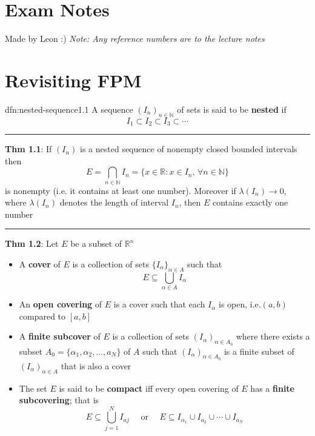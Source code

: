 \documentclass[landscape, 8pt]{extarticle}
\begin{document}
\setlength{\abovedisplayskip}{3.5pt}
\setlength{\belowdisplayskip}{3.5pt}
\setlength{\abovedisplayshortskip}{3.5pt}
\setlength{\belowdisplayshortskip}{3.5pt}

\begin{multicols}{3}
\raggedcolumns


\section*{\huge Exam Notes}
Made by Leon :) \textit{Note: Any reference numbers are to the lecture notes}

\vspace{-5pt}
\section{Revisiting FPM}

\begin{dfn}{dfn:nested-sequence}{1.1}
	A sequence $(I_{n})_{n\in\mathbb{N}}$ of sets is said to be \textbf{nested} if
	\[I_{1} \subset I_{2} \subset I_{3} \subset \cdots\]

	\noindent\rule{\textwidth}{0.2pt}
	\textbf{Thm 1.1}: If $(I_{n})$ is a nested sequence of nonempty closed bounded intervals then
	$$E = \bigcap\limits_{n\in\mathbb{N}} I_{n} = \{x\in\mathbb{R}: x\in I_{n},\,\forall n\in\mathbb{N}\}$$
	is nonempty (i.e. it contains at least one number). Moreover if $\lambda(I_{n})\to 0$, where $\lambda(I_{n})$ denotes the length of interval $I_{n}$, then $E$ contains exactly one number

	\noindent\rule{\textwidth}{0.2pt}
	\textbf{Thm 1.2}: Let $E$ be a subset of $\mathbb{R}^n$
	\begin{itemize}
		\setlength\itemsep{0em}
		\item A \textbf{cover} of $E$ is a collection of sets  $\{I_{\alpha}\}_{\alpha\in A}$ such that
			\[E\subseteq \bigcup\limits_{\alpha\in A} I_{\alpha}\]
		\item An \textbf{open covering} of $E$ is a cover such that each $I_{\alpha}$ is open, i.e.$(a,b)$ compared to $[a,b]$
		\item A \textbf{finite subcover} of $E$ is a collection of sets $(I_{\alpha})_{\alpha\in A_{0}}$ where there exists a subset $A_{0} = \{\alpha_{1}, \alpha_{2}, \dots, a_{N}\}$ of $A$ such that $(I_{\alpha})_{\alpha\in A_{0}}$ is a finite subset of $(I_{\alpha})_{\alpha\in A}$ that is also a cover
		\item The set $E$ is said to be \textbf{compact} iff every open covering of $E$ has a \textbf{finite subcovering}; that is
			\[E\subseteq \bigcup\limits_{j=1}^{N} I_{aj} \quad \text{ or } \quad E \subseteq I_{\alpha_{1}} \cup I_{a_{2}} \cup \cdots \cup I_{a_{N}}\]
	\end{itemize}
\end{dfn}


\end{multicols}
\end{document}
